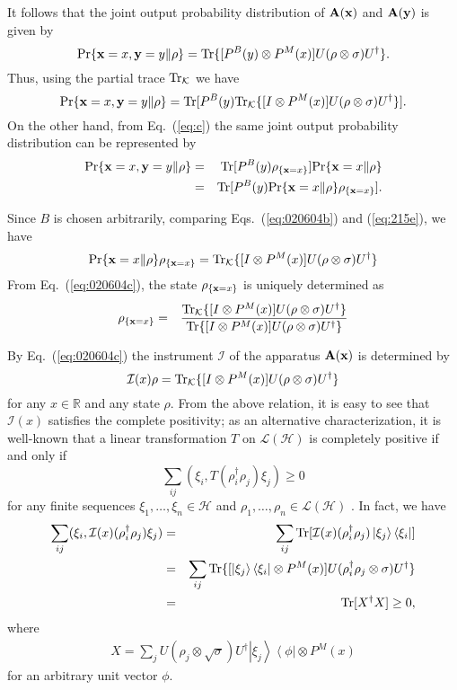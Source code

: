 \documentclass[12pt]{article}
\newcommand{\beq}{\begin{equation}}
\newcommand{\eeq}{\end{equation}}
\newcommand{\beql}[1]{\begin{equation}\label{eq:#1}}
\newcommand{\beqas}{\begin{eqnarray*}}
\newcommand{\eeqas}{\end{eqnarray*}}
\newcommand{\bA}{{\bf A}}
\newcommand{\cH}{{\mathcal H}}
\newcommand{\cI}{{\mathcal I}}
\newcommand{\cK}{{\mathcal K}}
\newcommand{\cL}{{\mathcal L}}
\newcommand{\da}{\dagger}
\newcommand{\nn}{\nonumber}
\newcommand{\ph}{\phi}
\newcommand{\rh}{\rho}
\newcommand{\si}{\sigma}
\newcommand{\tc}{\cL}
\newcommand{\Eq}[1]{Eq.~(\ref{eq:#1})}
\newcommand{\Tr}{\mbox{\rm Tr}}
\newcommand{\bx}{{\bf x}}
\newcommand{\by}{{\bf y}}
\newcommand{\eq}[1]{(\ref{eq:#1})}
\newcommand{\R}{\mathbb{R}}
\newcommand{\bra}[1]{\left\langle#1\right|}
\newcommand{\ket}[1]{\left|#1\right\rangle}
\begin{document}
It follows that the joint output probability distribution of 
 $\bA(\bx)$ and $\bA(\by)$ is given by
\beq
{\rm Pr}\{\bx=x,\by=y\|\rh\}
=\Tr\{[P^{B}(y)\otimes P^{M}(x)]
U(\rh\otimes\sigma)U^{\dagger}\}.
\label{eq:215d}
\eeq
Thus, using the partial trace $\Tr_{\cK}$ we have
\beq
\Pr\{\bx=x,\by=y\|\rh\}
=\Tr[P^{B}(y) \Tr_{\cK}\{[I\otimes P^{M}(x)]U(\rh\otimes\sigma)U^{\dagger}\}].
\label{eq:020604b}
\eeq
On the other hand, from \Eq{c}
the same joint output probability distribution can be represented by
\begin{eqnarray}
{\rm Pr}\{\bx=x,\by=y\|\rh\}
&=&
{\Tr}[P^{B}(y)\rh_{\{\bx=x\}}]
{\Pr}\{\bx=x\|\rh\}\nn\\
&=&
{\Tr}[P^{B}(y){\Pr}\{\bx=x\|\rh\}\rh_{\{\bx=x\}}].
\label{eq:215e}
\end{eqnarray}

Since $B$ is chosen arbitrarily,
comparing Eqs.~\eq{020604b} and \eq{215e}, we have
\beql{020604c}
{\Pr}\{\bx=x\|\rh\}\rh_{\{\bx=x\}}=
\Tr_{\cK}\{[I\otimes P^{M}(x)]
U(\rh\otimes\sigma)U^{\dagger}\}
\eeq
From \Eq{020604c}, the state 
$\rh_{\{\bx=x\}}$ is uniquely determined as
\begin{eqnarray}
\rh_{\{\bx=x\}}
&=&
\frac{\Tr_{{\cal K}}\{[I\otimes P^{M}(x)]
U(\rh\otimes\sigma)U^{\dagger}\}}
     {\Tr\{[I\otimes
P^{M}(x)]U(\rh\otimes\sigma)U^{\dagger}\}}
\label{eq:215f}
\end{eqnarray}


By \Eq{020604c} the instrument $\cI$ of the apparatus $\bA(\bx)$
is determined  by
\beql{020609a}
\cI(x)\rh=\Tr_{{\cal K}}\{[I\otimes P^{M}(x)]
U(\rh\otimes\sigma)U^{\dagger}\}
\eeq
for any $x\in\R$ and any state $\rh$.
From the above relation, it is easy to see that
$\cI(x)$ satisfies the complete positivity;
as an alternative characterization, 
it is well-known that a linear transformation $T$ on
$\tc(\cH)$ is completely positive if and only if 
\beq
\sum_{ij}
(\xi_{i},T(\rh_{i}^{\da}\rh_{j})\xi_{j})\ge 0
\eeq
for any finite sequences $\xi_{1},\ldots,\xi_{n}\in\cH$ and 
$\rh_{1},\ldots,\rh_{n}\in\tc(\cH)$ \cite{84QC}.
In fact, we have
\beqas
\sum_{ij}
(\xi_{i},\cI(x)(\rh_{i}^{\da}\rh_{j})\xi_{j})
&=&\sum_{ij}\Tr[\cI(x)(\rh_{i}^{\da}\rh_{j})\ket{\xi_{j}}\bra{\xi_i}]\\
&=&\sum_{ij}\Tr\{[\ket{\xi_{j}}\bra{\xi_i}\otimes P^{M}(x)]U(\rh_{i}^{\da}\rh_{j}\otimes \si)U^{\da}\}\\
&=&\Tr[X^{\da}X]\ge 0,
\eeqas
where 
\beqas
X=\sum_{j}U(\rh_j\otimes \sqrt{\si})U^{\da}\ket{\xi_j}\bra{\ph}\otimes P^{M}(x)
\eeqas
for an arbitrary unit vector $\ph$.
\end{document}
